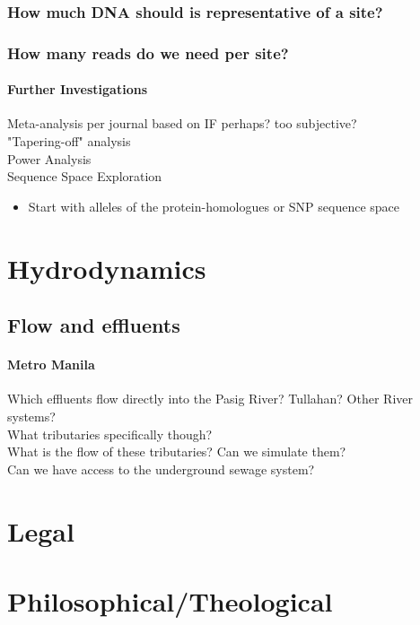 \documentclass[11.5pt]{report}
\begin{document}
\subsection{How much DNA should is representative of a site?}
\subsection{How many reads do we need per site?}
\subsubsection{Further Investigations}
Meta-analysis per journal based on IF perhaps? too subjective? \\
"Tapering-off" analysis \\
Power Analysis \\
Sequence Space Exploration
\begin{itemize}
	\item Start with alleles of the protein-homologues or SNP sequence space
\end{itemize}


\chapter{Hydrodynamics}
\section{Flow and effluents}
\subsubsection{Metro Manila}
Which effluents flow directly into the Pasig River? Tullahan? Other River systems? \\
What tributaries specifically though? \\
What is the flow of these tributaries? Can we simulate them? \\
Can we have access to the underground sewage system? \\


\chapter{Legal}


\chapter{Philosophical/Theological}
\end{document}

